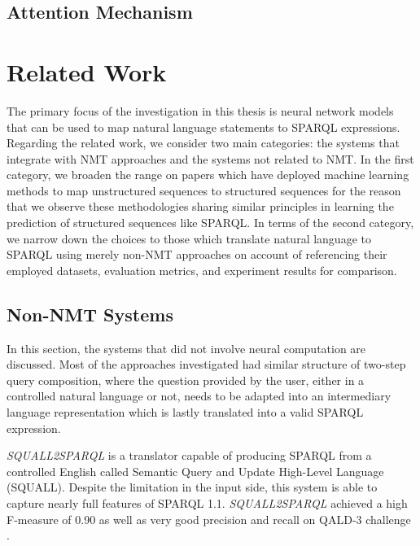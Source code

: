 \subsection{Attention Mechanism} \label{subsection:attention}






\section{Related Work} \label{section:related work}

The primary focus of the investigation in this thesis is neural network models that can be used to map natural language statements to SPARQL expressions. Regarding the related work, we consider two main categories: the systems that integrate with NMT approaches and the systems not related to NMT. In the first category, we broaden the range on papers which have deployed machine learning methods to map unstructured sequences to structured sequences for the reason that we observe these methodologies sharing similar principles in learning the prediction of structured sequences like SPARQL. In terms of the second category, we narrow down the choices to those which translate natural language to SPARQL using merely non-NMT approaches on account of referencing their employed datasets, evaluation metrics, and experiment results for comparison. 

\subsection{Non-NMT Systems} \label{subsection: non-nmt related work}

In this section, the systems that did not involve neural computation are discussed. Most of the approaches investigated had similar structure of two-step query composition, where the question provided by the user, either in a controlled natural language or not, needs to be adapted into an intermediary language representation which is lastly translated into a valid SPARQL expression.

\textit{SQUALL2SPARQL} \cite{ferre:hal-00943522} is a translator capable of producing SPARQL from a controlled English called Semantic Query and Update High-Level Language (SQUALL). Despite the limitation in the input side, this system is able to capture nearly full features of SPARQL 1.1. \textit{SQUALL2SPARQL} achieved a high F-measure of 0.90 as well as very good precision and recall on QALD-3 challenge \cite{cabrio2013qald}.


